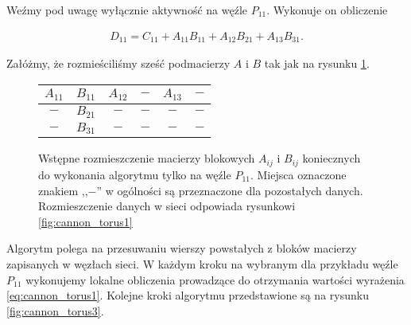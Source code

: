 \noindent Weźmy pod uwagę wyłącznie aktywność na węźle \(P_{11}\). Wykonuje on obliczenie

\begin{align}\label{eq:cannon_torus1}
D_{11}=C_{11}+A_{11}B_{11} + A_{12}B_{21} + A_{13}B_{31}.
\end{align}

\noindent Załóżmy, że rozmieściliśmy sześć podmacierzy \(A\) i \(B\) tak jak na rysunku \ref{fig:cannon_torus2}.

\begin{figure}[h]
\centering
\begin{tabular}{|cc|cc|cc|}
\hline
\(A_{11}\) & \(B_{11}\) & \(A_{12}\) & \(-\) & \(A_{13}\) & \(-\) \\
\hline
\(-\) & \(B_{21}\) & \(-\) & \(-\) & \(-\) & \(-\) \\
\hline
\(-\) & \(B_{31}\) & \(-\) & \(-\) & \(-\) & \(-\) \\
\hline
\end{tabular}
\caption{Wstępne rozmieszczenie macierzy blokowych \(A_{ij}\) i \(B_{ij}\) koniecznych do wykonania algorytmu tylko na węźle \(P_{11}\). Miejsca oznaczone znakiem ,,\(-\)'' w ogólności są przeznaczone dla pozostałych danych. Rozmieszczenie danych w sieci odpowiada rysunkowi 
\ref{fig:cannon_torus1}}
\label{fig:cannon_torus2}
\end{figure}

\noindent Algorytm polega na przesuwaniu wierszy powstałych z bloków macierzy zapisanych w węzłach sieci. W każdym kroku na wybranym dla przykładu węźle \(P_{11}\) wykonujemy lokalne obliczenia prowadzące do otrzymania wartości wyrażenia \eqref{eq:cannon_torus1}. Kolejne kroki algorytmu przedstawione są na rysunku \ref{fig:cannon_torus3}.


